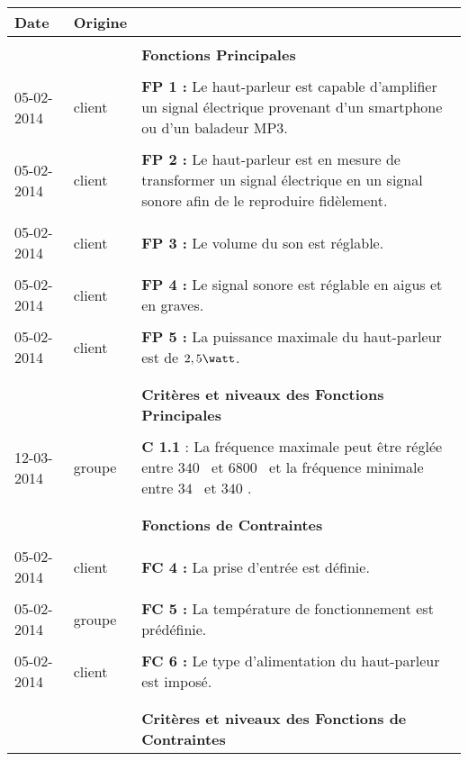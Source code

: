 \begin{center}
\begin{tabular}{|p{2cm}|p{1.5cm}|p{13.2cm}|}
 		\textbf{Date} & \textbf{Origine} & \\
 \hline
 	& &\\
		& & \textbf{Fonctions Principales} \\
 	& &\\
		05-02-2014 & client & \textbf{FP 1 :} Le haut-parleur est capable d’amplifier un signal électrique provenant d’un smartphone ou d’un baladeur MP3.\\
	& &\\
		05-02-2014 & client & \textbf{FP 2 :} Le haut-parleur est en mesure de transformer un signal électrique en un signal sonore afin de le reproduire fidèlement.  \\
	& &\\
		05-02-2014 & client & \textbf{FP 3 :} Le volume du son est réglable.\\
	& &\\
		05-02-2014 & client & \textbf{FP 4 :} Le signal sonore est réglable en aigus et en graves.\\
	& &\\
		05-02-2014 & client & \textbf{FP 5 :} La puissance maximale du haut-parleur est de $2,5  \watt$.\\
	& &\\
\hline
	 & &\\
	 	& & \textbf{Critères et niveaux des Fonctions Principales} \\
	 & &\\
	 	12-03-2014 & groupe & \textbf{C 1.1} : La fréquence maximale peut être réglée entre $340$ \hertz \, et $6800$ \hertz \, et la fréquence minimale entre $34$ \hertz \, et $340$ \hertz.\\
	 & &\\
\hline
	 & &\\
	 & & \textbf{ Fonctions de Contraintes}\\
	 & &\\
		05-02-2014 & client & \textbf{FC 4 :} La prise d’entrée est définie.\\
	 & &\\
		05-02-2014 & groupe & \textbf{FC 5 :} La température de fonctionnement est prédéfinie.\\
	 & &\\
		05-02-2014 & client & \textbf{FC 6 :} Le type d’alimentation du haut-parleur est imposé.\\
	 & &\\
\hline
	& &\\
		& & \textbf{ Critères et niveaux des Fonctions de Contraintes}\\

\end{tabular}
\end{center}
